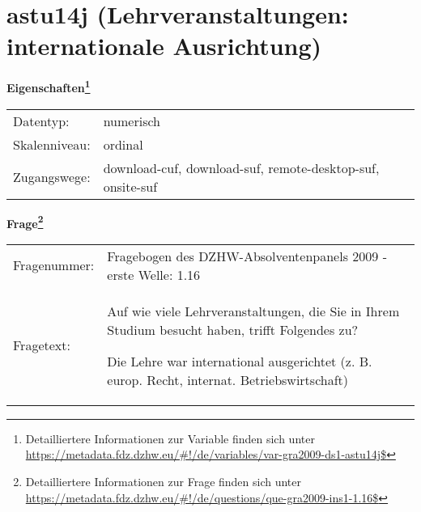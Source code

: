 
    \setcounter{footnote}{0}

    \vspace*{-1.8cm}
	\section{astu14j (Lehrveranstaltungen: internationale Ausrichtung)}
	\label{section:astu14j}



    \vspace*{0.5cm}
    \noindent\textbf{Eigenschaften\footnote{Detailliertere Informationen zur Variable finden sich unter
		\url{https://metadata.fdz.dzhw.eu/\#!/de/variables/var-gra2009-ds1-astu14j$}}}\\
	\begin{tabularx}{\hsize}{@{}lX}
	Datentyp: & numerisch \\
	Skalenniveau: & ordinal \\
	Zugangswege: &
	  download-cuf, 
	  download-suf, 
	  remote-desktop-suf, 
	  onsite-suf
 \\
    \end{tabularx}



				\vspace*{0.5cm}
                \noindent\textbf{Frage\footnote{Detailliertere Informationen zur Frage finden sich unter
		              \url{https://metadata.fdz.dzhw.eu/\#!/de/questions/que-gra2009-ins1-1.16$}}}\\
				\begin{tabularx}{\hsize}{@{}lX}
					Fragenummer: &
					  Fragebogen des DZHW-Absolventenpanels 2009 - erste Welle:
					  1.16
 \\
					Fragetext: & Auf wie viele Lehrveranstaltungen, die Sie in Ihrem Studium besucht haben, trifft Folgendes zu?\par  Die Lehre war international ausgerichtet (z. B. europ. Recht, internat. Betriebswirtschaft) \\
				\end{tabularx}





